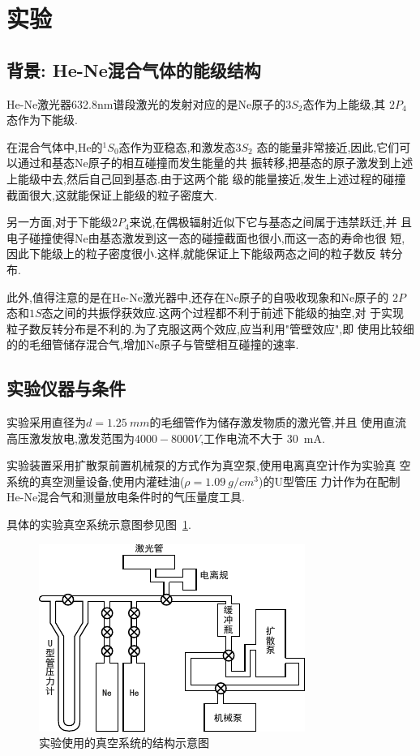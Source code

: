 \documentclass[aps,pre,12pt,preprint,onecolumn,showpacs,showkeys]{revtex4-1}
\begin{document}
\section{实验}

\subsection{背景: He-Ne混合气体的能级结构}

He-Ne激光器632.8nm谱段激光的发射对应的是Ne原子的$3S_2$态作为上能级,其
$2P_4$态作为下能级.

在混合气体中,He的$^1S_0$态作为亚稳态,和激发态$3S_2$
态的能量非常接近,因此,它们可以通过和基态Ne原子的相互碰撞而发生能量的共
振转移,把基态的原子激发到上述上能级中去,然后自己回到基态.由于这两个能
级的能量接近,发生上述过程的碰撞截面很大,这就能保证上能级的粒子密度大.

另一方面,对于下能级$2P_4$来说,在偶极辐射近似下它与基态之间属于违禁跃迁,并
且电子碰撞使得Ne由基态激发到这一态的碰撞截面也很小,而这一态的寿命也很
短,因此下能级上的粒子密度很小.这样,就能保证上下能级两态之间的粒子数反
转分布.

此外,值得注意的是在He-Ne激光器中,还存在Ne原子的自吸收现象和Ne原子的
$2P$态和$1S$态之间的共振俘获效应.这两个过程都不利于前述下能级的抽空,对
于实现粒子数反转分布是不利的.为了克服这两个效应,应当利用"管壁效应",即
使用比较细的的毛细管储存混合气,增加Ne原子与管壁相互碰撞的速率.\cite{book}

\subsection{实验仪器与条件}

实验采用直径为$d = \SI{1.25}{mm}$的毛细管作为储存激发物质的激光管,并且
使用直流高压激发放电,激发范围为$4000-8000\si{V}$,工作电流不大于
\SI{30}{mA}.

实验装置采用扩散泵前置机械泵的方式作为真空泵,使用电离真空计作为实验真
空系统的真空测量设备,使用内灌硅油($\rho = \SI{1.09}{g/cm^3}$)的U型管压
力计作为在配制He-Ne混合气和测量放电条件时的气压量度工具.

具体的实验真空系统示意图参见图~\ref{fig:ins}.

\begin{figure}[htbp]
  \centering
  \includegraphics[width=.8\textwidth]{graph2.pdf}
\caption{\label{fig:ins}%
实验使用的真空系统的结构示意图
}
\end{figure}
\end{document}
